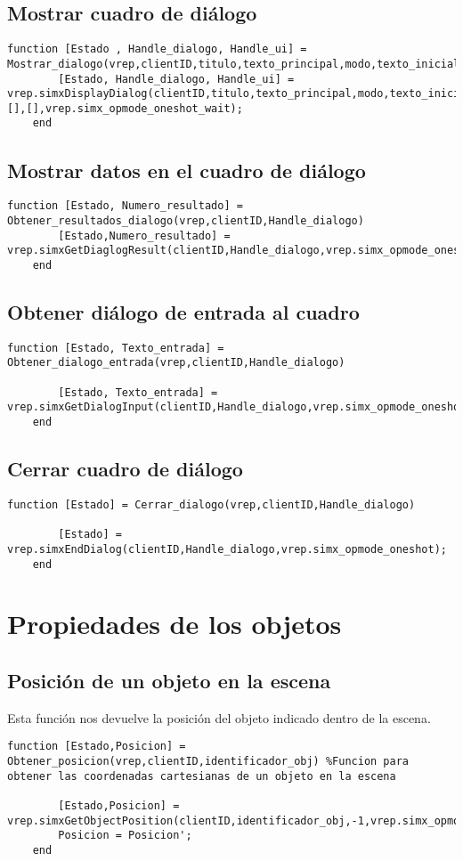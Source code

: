 \subsection{Mostrar cuadro de diálogo}
\begin{lstlisting}[frame=single]
function [Estado , Handle_dialogo, Handle_ui] = Mostrar_dialogo(vrep,clientID,titulo,texto_principal,modo,texto_inicial)
        [Estado, Handle_dialogo, Handle_ui] = vrep.simxDisplayDialog(clientID,titulo,texto_principal,modo,texto_inicial,[],[],vrep.simx_opmode_oneshot_wait);
    end
\end{lstlisting}
\subsection{Mostrar datos en el cuadro de diálogo}
\begin{lstlisting}[frame=single]
function [Estado, Numero_resultado] = Obtener_resultados_dialogo(vrep,clientID,Handle_dialogo)
        [Estado,Numero_resultado] = vrep.simxGetDiaglogResult(clientID,Handle_dialogo,vrep.simx_opmode_oneshot);
    end
\end{lstlisting}
\subsection{Obtener diálogo de entrada al cuadro }
\begin{lstlisting}[frame=single]
function [Estado, Texto_entrada] = Obtener_dialogo_entrada(vrep,clientID,Handle_dialogo)
        
        [Estado, Texto_entrada] = vrep.simxGetDialogInput(clientID,Handle_dialogo,vrep.simx_opmode_oneshot_wait);
    end
\end{lstlisting}
\subsection{Cerrar cuadro de diálogo}
\begin{lstlisting}[frame=single]
function [Estado] = Cerrar_dialogo(vrep,clientID,Handle_dialogo)
       
        [Estado] = vrep.simxEndDialog(clientID,Handle_dialogo,vrep.simx_opmode_oneshot);
    end
\end{lstlisting}
\section{Propiedades de los objetos}
\subsection{Posición de un objeto en la escena}
Esta función nos devuelve la posición del objeto indicado dentro de la escena.
\begin{lstlisting}[frame=single]
function [Estado,Posicion] = Obtener_posicion(vrep,clientID,identificador_obj) %Funcion para obtener las coordenadas cartesianas de un objeto en la escena
        
        [Estado,Posicion] = vrep.simxGetObjectPosition(clientID,identificador_obj,-1,vrep.simx_opmode_oneshot_wait);
        Posicion = Posicion';
    end
\end{lstlisting}
